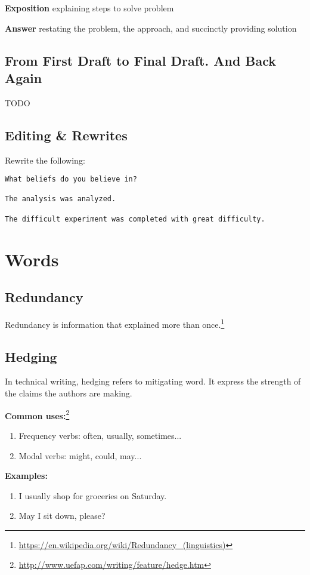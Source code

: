 \documentclass[10pt,a4paper]{book}
\begin{document}
\textbf{Exposition} explaining steps to solve problem

\textbf{Answer} restating the problem, the approach, and succinctly providing solution


\section{From First Draft to Final Draft. And Back Again}

\color{BrickRed}TODO\color{black}


\section{Editing \& Rewrites}

Rewrite the following:
\begin{verbatim}
What beliefs do you believe in?

The analysis was analyzed.

The difficult experiment was completed with great difficulty.
\end{verbatim}



\chapter{Words}



\section{Redundancy}\label{Redundancy}

Redundancy is information that explained more than once.\footnote{\url{https://en.wikipedia.org/wiki/Redundancy_(linguistics)}}



\section{Hedging}\label{Hedging}

In technical writing, hedging refers to mitigating word. It express the strength of the claims the authors are making.

\textbf{Common uses:}\footnote{\url{http://www.uefap.com/writing/feature/hedge.htm}}
\begin{enumerate}
\item  Frequency verbs: often, usually, sometimes...
\item  Modal verbs: might, could, may...
\end{enumerate}
\textbf{Examples:}
\begin{enumerate}
\item I usually shop for groceries on Saturday.
\item May I sit down, please?
\end{enumerate}
\end{document}
